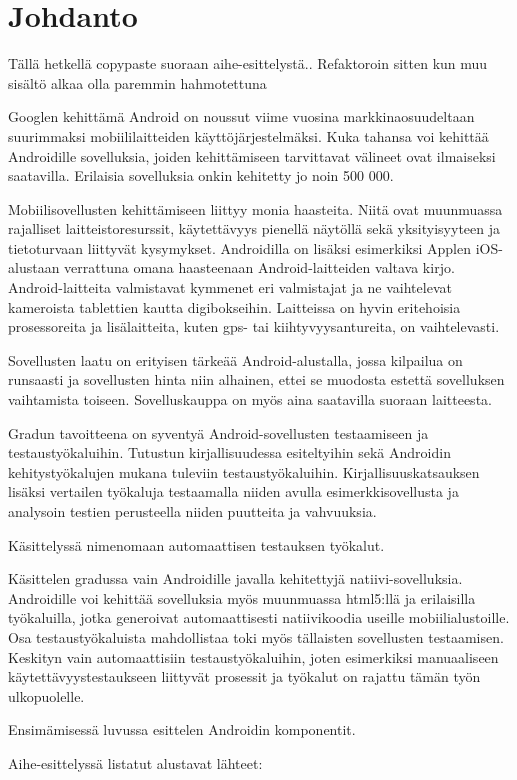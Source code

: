\section{Johdanto}

Tällä hetkellä copypaste suoraan aihe-esittelystä.. Refaktoroin sitten kun muu sisältö alkaa olla paremmin hahmotettuna

Googlen kehittämä Android on noussut viime vuosina markkinaosuudeltaan suurimmaksi mobiililaitteiden käyttöjärjestelmäksi. Kuka tahansa voi kehittää Androidille sovelluksia, joiden kehittämiseen tarvittavat välineet ovat ilmaiseksi saatavilla. Erilaisia sovelluksia onkin kehitetty jo noin 500 000.

Mobiilisovellusten kehittämiseen liittyy monia haasteita. Niitä ovat muunmuassa rajalliset laitteistoresurssit, käytettävyys pienellä näytöllä sekä yksityisyyteen ja tietoturvaan liittyvät kysymykset. Androidilla on lisäksi esimerkiksi Applen iOS-alustaan verrattuna omana haasteenaan Android-laitteiden valtava kirjo. Android-laitteita valmistavat kymmenet eri valmistajat ja ne vaihtelevat kameroista tablettien kautta digibokseihin. Laitteissa on hyvin eritehoisia prosessoreita ja lisälaitteita, kuten gps- tai kiihtyvyysantureita, on vaihtelevasti.

Sovellusten laatu on erityisen tärkeää Android-alustalla, jossa kilpailua on runsaasti ja sovellusten hinta niin alhainen, ettei se muodosta estettä sovelluksen vaihtamista toiseen. Sovelluskauppa on myös aina saatavilla suoraan laitteesta.

Gradun tavoitteena on syventyä Android-sovellusten testaamiseen ja testaustyökaluihin. Tutustun kirjallisuudessa esiteltyihin sekä Androidin kehitystyökalujen mukana tuleviin testaustyökaluihin. Kirjallisuuskatsauksen lisäksi vertailen työkaluja testaamalla niiden avulla esimerkkisovellusta ja analysoin testien perusteella niiden puutteita ja vahvuuksia.

Käsittelyssä nimenomaan automaattisen testauksen työkalut.

Käsittelen gradussa vain Androidille javalla kehitettyjä natiivi-sovelluksia. Androidille voi kehittää sovelluksia myös muunmuassa html5:llä ja erilaisilla työkaluilla, jotka generoivat automaattisesti natiivikoodia useille mobiilialustoille. Osa testaustyökaluista mahdollistaa toki myös tällaisten sovellusten testaamisen. Keskityn vain automaattisiin testaustyökaluihin, joten esimerkiksi manuaaliseen käytettävyystestaukseen liittyvät prosessit ja työkalut on rajattu tämän työn ulkopuolelle.

Ensimämisessä luvussa esittelen Androidin komponentit.

Aihe-esittelyssä listatut alustavat lähteet: 
\cite{takalaetal11} 
\cite{hyungkeunetal11}
\cite{kropp10}
\cite{mirzaeietal12}
\cite{hu10}
\cite{wasserman10}
\cite{hampark11}